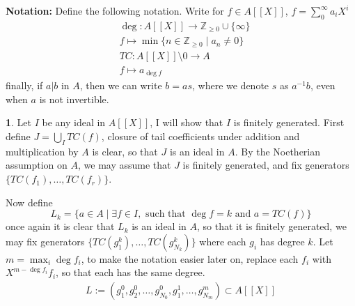 \documentclass[11pt]{article}
\theoremstyle{definition}
\newtheorem{pb}{}
\newcommand{\set}[1]{\{#1\}}
\newcommand{\tand}{\text{ and }}
\begin{document}
    \textbf{Notation:} Define the following notation. Write for \(f \in A[[X]]\), \(f = \sum_0^\infty a_iX^i\)
    \begin{align*}
        &\deg: A[[X]] \to \mathbb{Z}_{\geq 0}\cup\set{\infty} \\
        &f \mapsto \min\set{n \in \mathbb{Z}_{\geq 0} \mid a_n \neq 0} \\
        &TC: A[[X]] \setminus 0 \to A \\
        &f \mapsto a_{\deg f}
    \end{align*}
    finally, if \(a \vert b\) in \(A\), then we can write \(b = as\), where we denote \(s\) as \(a^{-1}b\), even when \(a\) is not invertible.

    \begin{pb}
        Let \(I\) be any ideal in \(A[[X]]\), I will show that \(I\) is finitely generated. First define \(J = \bigcup_I TC(f)\), closure of tail coefficients under addition and multiplication by \(A\) is clear, so that \(J\) is an ideal in \(A\). By the Noetherian assumption on \(A\), we may assume that \(J\) is finitely generated, and fix generators \(\set{TC(f_1),\hdots,TC(f_r)}\).
        
        Now define \[L_k = \set{a \in A \mid \exists f \in I, \text{ such that } \deg f = k \tand a = TC(f)}\]
        once again it is clear that \(L_k\) is an ideal in \(A\), so that it is finitely generated, we may fix generators \(\set{TC(g^k_1),\hdots,TC(g^k_{N_k})}\) where each \(g_i\) has degree \(k\). Let \(m = \max_i\deg f_i\), to make the notation easier later on, replace each \(f_i\) with \(X^{m - \deg f_i}f_i\), so that each has the same degree.
        \begin{align*}
            L := (g_1^0,g_2^0,\hdots,g_{N_0}^0,g_1^1,\hdots,g_{N_m}^m) \subset A[[X]]
        \end{align*}


\end{pb}
\end{document}
